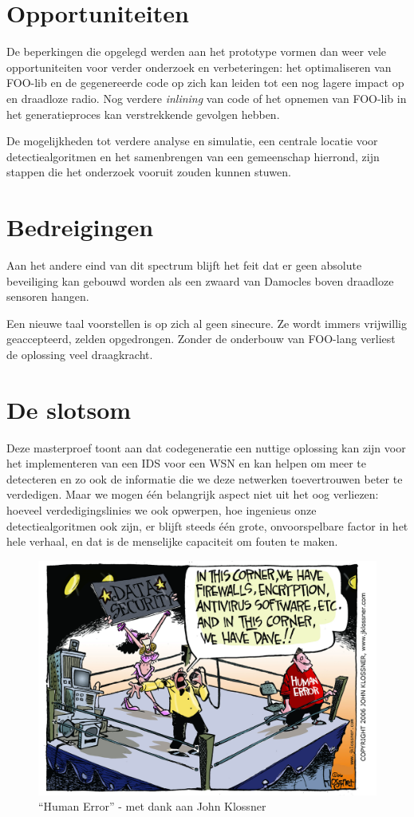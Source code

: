 \section{Opportuniteiten}
\label{section:opportunities}

De beperkingen die opgelegd werden aan het prototype vormen dan weer vele
opportuniteiten voor verder onderzoek en verbeteringen: het optimaliseren van
FOO-lib en de gegenereerde code op zich kan leiden tot een nog lagere impact op
\mcu en draadloze radio. Nog verdere \emph{inlining} van code of het opnemen
van FOO-lib in het generatieproces kan verstrekkende gevolgen hebben.

De mogelijkheden tot verdere analyse en simulatie, een centrale locatie voor
detectiealgoritmen en het samenbrengen van een gemeenschap hierrond, zijn
stappen die het onderzoek vooruit zouden kunnen stuwen.

\vspace{-2mm}

\section{Bedreigingen}
\label{section:threaths}

Aan het andere eind van dit spectrum blijft het feit dat er geen absolute
beveiliging kan gebouwd worden als een zwaard van Damocles boven draadloze
sensoren hangen.

Een nieuwe taal voorstellen is op zich al geen sinecure. Ze wordt immers
vrijwillig geaccepteerd, zelden opgedrongen. Zonder de onderbouw van FOO-lang
verliest de oplossing veel draagkracht.

\vspace{-2mm}

\section{De slotsom}
\label{section:bottom-line}

Deze masterproef toont aan dat codegeneratie een nuttige oplossing kan zijn
voor het implementeren van een IDS voor een WSN en kan helpen om meer te
detecteren en zo ook de informatie die we deze netwerken toevertrouwen beter te
verdedigen. Maar we mogen \'e\'en belangrijk aspect niet uit het oog verliezen:
hoeveel verdedigingslinies we ook opwerpen, hoe ingenieus onze
detectiealgoritmen ook zijn, er blijft steeds \'e\'en grote, onvoorspelbare
factor in het hele verhaal, en dat is de menselijke capaciteit om fouten te
maken.

\begin{figure}[ht]
  \centering
  \includegraphics[width=0.72\linewidth]{resources/cartoon_human_error.jpg}
  \caption[``Human Error'']{``Human Error'' - met dank aan John Klossner}
\end{figure}
